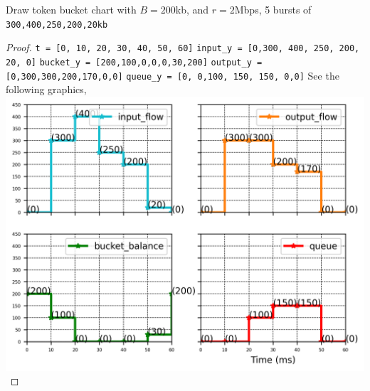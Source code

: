 \documentclass[./answersheet.tex]{subfiles}
\begin{document}
\begin{wts}
    Draw token bucket chart with $B=200$kb, and $r=2$Mbps, 5 bursts of \verb|300,400,250,200,20kb|
\end{wts}
\begin{proof}
    \verb|t = [0, 10, 20, 30, 40, 50, 60]|
    \verb|input_y = [0,300, 400, 250, 200, 20, 0]|
    \verb|bucket_y = [200,100,0,0,0,30,200]|
    \verb|output_y = [0,300,300,200,170,0,0]|
    \verb|queue_y = [0, 0,100, 150, 150, 0,0]|
    See the following graphics,\\
    \includegraphics[width=\columnwidth]{./308_plots_all.png}
\end{proof}
\end{document}
